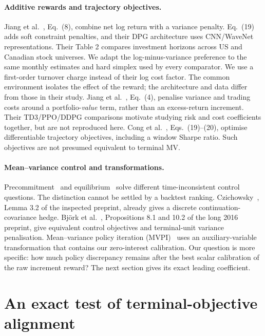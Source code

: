 \documentclass[sigconf,anonymous,review]{acmart}
\begin{document}
\paragraph{Additive rewards and trajectory objectives.}
Jiang et al.\ \cite{jiang2025}, Eq.\ (8), combine net log return with a variance penalty. Eq.\ (19) adds soft constraint penalties, and their DPG architecture uses CNN/WaveNet representations. Their Table 2 compares investment horizons across US and Canadian stock universes. We adapt the log-minus-variance preference to the same monthly estimates and hard simplex used by every comparator. We use a first-order turnover charge instead of their log cost factor. The common environment isolates the effect of the reward; the architecture and data differ from those in their study. Jiang et al.\ \cite{jiang2024}, Eq.\ (4), penalise variance and trading costs around a portfolio-\emph{value} term, rather than an excess-return increment. Their TD3/PPO/DDPG comparisons motivate studying risk and cost coefficients together, but are not reproduced here. Cong et al.\ \cite{cong2026}, Eqs.\ (19)--(20), optimise differentiable trajectory objectives, including a window Sharpe ratio. Such objectives are not presumed equivalent to terminal MV.

\paragraph{Mean--variance control and transformations.}
Precommitment\ \cite{ling2000} and equilibrium\ \cite{basak2010,dai2023} solve different time-inconsistent control questions. The distinction cannot be settled by a backtest ranking. Czichowsky\ \cite{czichowsky2013}, Lemma 3.2 of the inspected preprint, already gives a discrete continuation-covariance hedge. Bj\"ork et al.\ \cite{bkm2016}, Propositions 8.1 and 10.2 of the long 2016 preprint, give equivalent control objectives and terminal-unit variance penalisation. Mean--variance policy iteration (MVPI)\ \cite{zhang2021} uses an auxiliary-variable transformation that contains our zero-interest calibration. Our question is more specific: how much policy discrepancy remains after the best scalar calibration of the raw increment reward? The next section gives its exact leading coefficient.

\section{An exact test of terminal-objective alignment}
\end{document}
